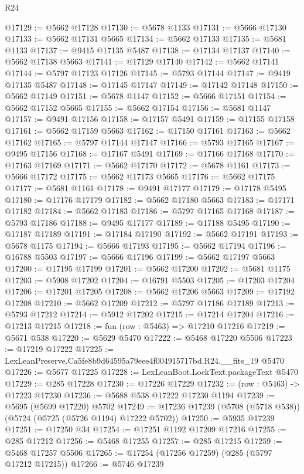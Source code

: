 \begin{lexlean}{R24}
\begin{coremodule}
@17129 := @5662 @17128
@17130 := @5678 @1133
@17131 := @5666 @17130
@17133 := @5662 @17131 @5665
@17134 := @5662 @17133
@17135 := @5681 @1133
@17137 := @9415 @17135 @5487
@17138 := @17134 @17137
@17140 := @5662 @17138 @5663
@17141 := @17129 @17140
@17142 := @5662 @17141
@17144 := @5797 @17123 @17126
@17145 := @5793 @17144
@17147 := @9419 @17135 @5487
@17148 := @17145 @17147
@17149 := @17142 @17148
@17150 := @5662 @17149
@17151 := @5678 @1147
@17152 := @5666 @17151
@17154 := @5662 @17152 @5665
@17155 := @5662 @17154
@17156 := @5681 @1147
@17157 := @9491 @17156
@17158 := @17157 @5491
@17159 := @17155 @17158
@17161 := @5662 @17159 @5663
@17162 := @17150 @17161
@17163 := @5662 @17162
@17165 := @5797 @17144 @17147
@17166 := @5793 @17165
@17167 := @9495 @17156
@17168 := @17167 @5491
@17169 := @17166 @17168
@17170 := @17163 @17169
@17171 := @5662 @17170
@17172 := @5678 @1161
@17173 := @5666 @17172
@17175 := @5662 @17173 @5665
@17176 := @5662 @17175
@17177 := @5681 @1161
@17178 := @9491 @17177
@17179 := @17178 @5495
@17180 := @17176 @17179
@17182 := @5662 @17180 @5663
@17183 := @17171 @17182
@17184 := @5662 @17183
@17186 := @5797 @17165 @17168
@17187 := @5793 @17186
@17188 := @9495 @17177
@17189 := @17188 @5495
@17190 := @17187 @17189
@17191 := @17184 @17190
@17192 := @5662 @17191
@17193 := @5678 @1175
@17194 := @5666 @17193
@17195 := @5662 @17194
@17196 := @16788 @5503
@17197 := @5666 @17196
@17199 := @5662 @17197 @5663
@17200 := @17195 @17199
@17201 := @5662 @17200
@17202 := @5681 @1175
@17203 := @5908 @17202
@17204 := @16791 @5503
@17205 := @17203 @17204
@17206 := @17201 @17205
@17208 := @5662 @17206 @5663
@17209 := @17192 @17208
@17210 := @5662 @17209
@17212 := @5797 @17186 @17189
@17213 := @5793 @17212
@17214 := @5912 @17202
@17215 := @17214 @17204
@17216 := @17213 @17215
@17218 := fun (row : @5463) => @17210 @17216
@17219 := @5671 @538
@17220 := @5629 @5470
@17222 := @5468 @17220 @5506
@17223 := @17219 @17222
@17225 := LexLeanPreserve.Ca5fe8b9d64595a79eee4f004915717bd.R24.__fits_19 @5470
@17226 := @5677 @17225
@17228 := LexLeanBoot.LockText.packageText @5470
@17229 := @285 @17228
@17230 := @17226 @17229
@17232 := (row : @5463) -> @17223 @17230
@17236 := @5688 @538 @17222 @17230 @1194
@17239 := @5695 (@5699 @17220) @5702
@17249 := @17236 @17239 (@5708 (@5718 @538)) (@5724 (@5725 (@5726 @1194) @17222 @5702))
@17250 := @5935 @17239
@17251 := @17250 @34
@17254 := @17251 @1192 @17209 @17216
@17255 := @285 @17212
@17256 := @5468 @17255
@17257 := @285 @17215
@17259 := @5468 @17257 @5506
@17265 := @17254 (@17256 @17259) (@285 (@5797 @17212 @17215))
@17266 := @5746 @17239

\end{coremodule}
\end{lexlean}
